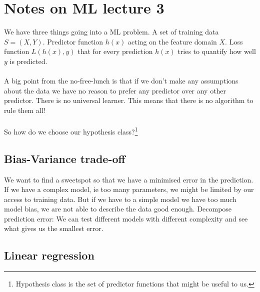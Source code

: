 \section{Notes on ML lecture 3}
We have three things going into a ML problem.
A set of training data $S = {(X,Y)}$.
Predictor function $h(x)$ acting on the feature domain $X$.
Loss function $L(h(x), y)$ that for every prediction $h(x)$ tries to
quantify how well $y$ is predicted.
\\
\\
A big point from the no-free-lunch is that if we don't make
any assumptions about the data we have no reason to prefer any
predictor over any other predictor. There is no universal learner.
This means that there is no algorithm to rule them all!
\\
\\
So how do we choose our hypothesis class?\footnote{Hypothesis class is the set of predictor functions that might be useful to us.}

\subsection{Bias-Variance trade-off}
We want to find a sweetspot so that we have a minimised error in the prediction.
If we have a complex model, ie too many parameters, we might be limited by our access to training data.
But if we have to a simple model we have too much model bias, we are not able to describe the data good enough.
Decompose prediction error:
We can test different models with different complexity and see what gives us the smallest error.

\subsection{Linear regression}

